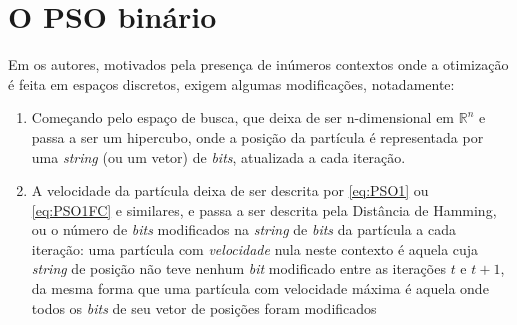 \documentclass[
	12pt,				%
	openright,			%
	twoside,			%
	a4paper,			%
	english,			%
	french,				%
	spanish,			%
	brazil				%
	]{abntex2}
\begin{document}
\chapter{O PSO binário}

Em \cite{kennedy1997discrete} os autores, motivados pela presença de inúmeros contextos onde a otimização é feita em espaços discretos, exigem algumas modificações, notadamente:

\begin{enumerate}
	\item Começando pelo espaço de busca, que deixa de ser n-dimensional em $\mathbb{R}^n$ e passa a ser um hipercubo, onde a posição da partícula é representada por uma \textit{string} (ou um vetor) de \textit{bits}, atualizada a cada iteração.
	\item A velocidade da partícula deixa de ser descrita por \ref{eq:PSO1} ou \ref{eq:PSO1FC} e similares, e passa a ser descrita pela Distância de Hamming, ou o número de \textit{bits} modificados na \textit{string} de \textit{bits} da partícula a cada iteração: uma partícula com \textit{velocidade} nula neste contexto é aquela cuja \textit{string} de posição não teve nenhum \textit{bit} modificado entre as iterações $t$ e $t + 1$, da mesma forma que uma partícula com velocidade máxima é aquela onde todos os \textit{bits} de seu vetor de posições foram modificados
\end{enumerate}  




\begin{table}[htb]
\end{table}
\end{document}
